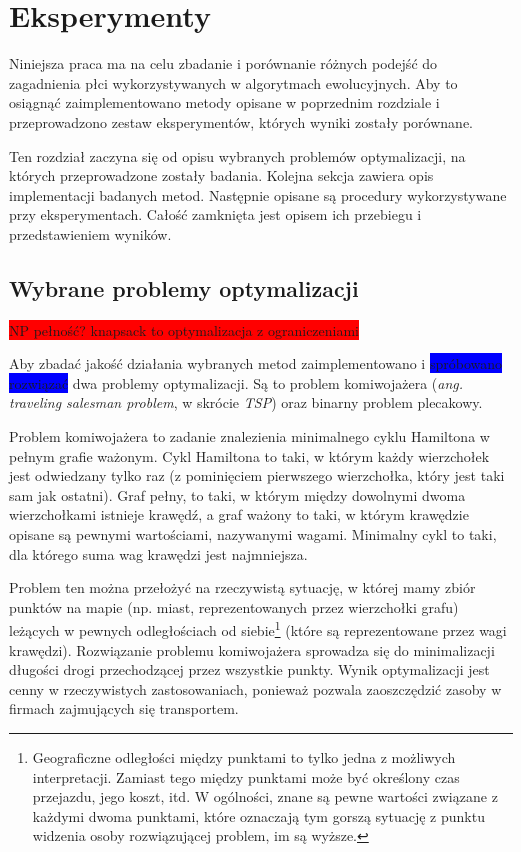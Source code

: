 \documentclass[twoside]{iisthesis}
\newcommand{\todo}{\colorbox{red}}
\newcommand{\fixme}{\colorbox{blue}}
\begin{document}
\chapter{Eksperymenty} \label{chapter:experiments}

Niniejsza praca ma na celu zbadanie i porównanie różnych podejść do zagadnienia płci wykorzystywanych w algorytmach ewolucyjnych.
Aby to osiągnąć zaimplementowano metody opisane w poprzednim rozdziale i przeprowadzono zestaw eksperymentów, których wyniki zostały porównane.

Ten rozdział zaczyna się od opisu wybranych problemów optymalizacji, na których przeprowadzone zostały badania. Kolejna sekcja zawiera opis implementacji badanych metod. Następnie opisane są procedury wykorzystywane przy eksperymentach. Całość zamknięta jest opisem ich przebiegu i przedstawieniem wyników.

\section{Wybrane problemy optymalizacji}

\todo{NP pełność? knapsack to optymalizacja z ograniczeniami}

Aby zbadać jakość działania wybranych metod zaimplementowano i \fixme{spróbowano rozwiązać} dwa problemy optymalizacji. 
Są to problem komiwojażera (\emph{ang. traveling salesman problem}, w skrócie \emph{TSP}) oraz binarny problem plecakowy.

Problem komiwojażera to zadanie znalezienia minimalnego cyklu Hamiltona w pełnym grafie ważonym. 
Cykl Hamiltona to taki, w którym każdy wierzchołek jest odwiedzany tylko raz (z pominięciem pierwszego wierzchołka, który jest taki sam jak ostatni). 
Graf pełny, to taki, w którym między dowolnymi dwoma wierzchołkami istnieje krawędź, a graf ważony to taki, w którym krawędzie opisane są pewnymi wartościami, nazywanymi wagami. 
Minimalny cykl to taki, dla którego suma wag krawędzi jest najmniejsza.

Problem ten można przełożyć na rzeczywistą sytuację, w której mamy zbiór punktów na mapie (np. miast, reprezentowanych przez wierzchołki grafu) leżących w pewnych odległościach od siebie\footnote{
	Geograficzne odległości między punktami to tylko jedna z możliwych interpretacji.
	Zamiast tego między punktami może być określony czas przejazdu, jego koszt, itd.
	W ogólności, znane są pewne wartości związane z każdymi dwoma punktami, które oznaczają tym gorszą sytuację z punktu widzenia osoby rozwiązującej problem, im są wyższe.
} (które są reprezentowane przez wagi krawędzi). 
Rozwiązanie problemu komiwojażera sprowadza się do minimalizacji długości drogi przechodzącej przez wszystkie punkty. 
Wynik optymalizacji jest cenny w rzeczywistych zastosowaniach, ponieważ pozwala zaoszczędzić zasoby w firmach zajmujących się transportem.
\end{document}
